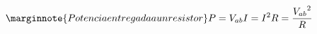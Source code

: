 \begin{equation}\label{25.18}\marginnote{Potencia entregada a un resistor}
P=V_{ab}I=I^2R=\frac{{V_{ab}}^2}{R}
\end{equation}














































